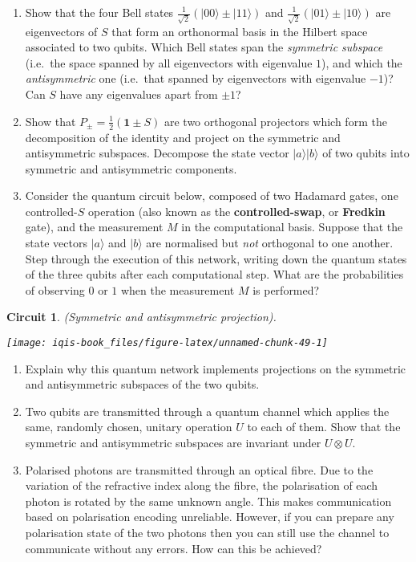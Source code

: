 \documentclass[fleqn]{article}
\newtheorem*{circuit}{Circuit}
\begin{document}
\begin{enumerate}
\def\labelenumi{\arabic{enumi}.}
\item
  Show that the four Bell states \(\frac{1}{\sqrt2}(|00\rangle\pm|11\rangle)\) and \(\frac{1}{\sqrt2}(|01\rangle\pm|10\rangle)\) are eigenvectors of \(S\) that form an orthonormal basis in the Hilbert space associated to two qubits.
  Which Bell states span the \emph{symmetric subspace} (i.e.~the space spanned by all eigenvectors with eigenvalue \(1\)), and which the \emph{antisymmetric} one (i.e.~that spanned by eigenvectors with eigenvalue \(-1\))?
  Can \(S\) have any eigenvalues apart from \(\pm1\)?
\item
  Show that \(P_\pm = \frac12(\mathbf{1}\pm S)\) are two orthogonal projectors which form the decomposition of the identity and project on the symmetric and antisymmetric subspaces.
  Decompose the state vector \(|a\rangle|b\rangle\) of two qubits into symmetric and antisymmetric components.
\item
  Consider the quantum circuit below, composed of two Hadamard gates, one controlled-\(S\) operation (also known as the \textbf{controlled-swap}, or \textbf{Fredkin} gate), and the measurement \(M\) in the computational basis.
  Suppose that the state vectors \(|a\rangle\) and \(|b\rangle\) are normalised but \emph{not} orthogonal to one another.
  Step through the execution of this network, writing down the quantum states of the three qubits after each computational step.
  What are the probabilities of observing \(0\) or \(1\) when the measurement \(M\) is performed?
\end{enumerate}

\begin{circuit}

(Symmetric and antisymmetric projection).

\begin{center}\texttt{[image: iqis-book\_files/figure-latex/unnamed-chunk-49-1]} \end{center}


\end{circuit}

\begin{enumerate}
\def\labelenumi{\arabic{enumi}.}
\setcounter{enumi}{3}
\item
  Explain why this quantum network implements projections on the symmetric and antisymmetric subspaces of the two qubits.
\item
  Two qubits are transmitted through a quantum channel which applies the same, randomly chosen, unitary operation \(U\) to each of them.
  Show that the symmetric and antisymmetric subspaces are invariant under \(U\otimes U\).
\item
  Polarised photons are transmitted through an optical fibre.
  Due to the variation of the refractive index along the fibre, the polarisation of each photon is rotated by the same unknown angle.
  This makes communication based on polarisation encoding unreliable.
  However, if you can prepare any polarisation state of the two photons then you can still use the channel to communicate without any errors.
  How can this be achieved?
\end{enumerate}
\end{document}
